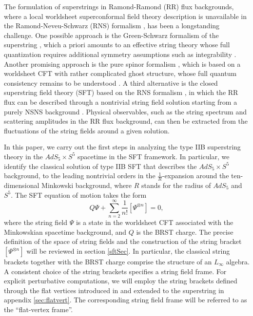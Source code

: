\documentclass[12pt]{article}
\def\be{\begin{equation}}
\def\ee{\end{equation}}
\numberwithin{equation}{section}
\begin{document}
The formulation of superstrings in Ramond-Ramond (RR) flux backgrounds, where a local worldsheet superconformal field theory description is unavailable in the Ramond-Neveu-Schwarz (RNS) formalism \cite{Friedan:1985ge, Polchinski:1998rr, Berenstein:1999ip, Berenstein:1999jq}, has been a longstanding challenge. One possible approach is the Green-Schwarz formalism of the superstring \cite{Green:1983wt, Grisaru:1985fv, Duff:1987bx, Metsaev:1998it}, which a priori amounts to an effective string theory \cite{Grisaru:1988sa, Roiban:2007jf, Giombi:2009gd} whose full quantization requires additional symmetry assumptions such as integrability \cite{Metsaev:2002re, Bena:2003wd}. Another promising approach is the pure spinor formalism \cite{Berkovits:2000fe, Berkovits:2001ue, Berkovits:2002zk, Berkovits:2004xu}, which is based on a worldsheet CFT with rather complicated ghost structure, whose full quantum consistency remains to be understood \cite{Berkovits:2006vi}. A third alternative is the closed superstring field theory (SFT) based on the RNS formalism \cite{deLacroix:2017lif, Sen:2024nfd}, in which the RR flux can be described through a nontrivial string field solution starting from a purely NSNS background \cite{Cho:2018nfn, Cho:2023mhw, Kim:2024dnw}. Physical observables, such as the string spectrum and scattering amplitudes in the RR flux background, can then be extracted from the fluctuations of the string fields around a given solution.

In this paper, we carry out the first steps in analyzing the type IIB superstring theory in the $AdS_5\times S^5$ spacetime in the SFT framework. In particular, we identify the classical solution of type IIB SFT that describes the $AdS_5 \times S^5$ background, to the leading nontrivial orders in the $\frac{1}{R}$-expansion around the ten-dimensional Minkowski background, where $R$ stands for the radius of $AdS_5$ and $S^5$. The SFT equation of motion takes the form \cite{Zwiebach:1992ie, Sen:2024nfd}
\be
Q \Psi + \sum\limits_{n=2}^\infty \frac{1}{n!}[\Psi^{\otimes n}] = 0,
\label{generalEOM}
\ee
where the string field $\Psi$ is a state in the worldsheet CFT associated with the Minkowskian spacetime background, and $Q$ is the BRST charge. The precise definition of the space of string fields and the construction of the string bracket $[\Psi^{\otimes n}]$ will be reviewed in section \ref{sftSec}. In particular, the classical string brackets together with the BRST charge comprise the structure of an $L_\infty$ algebra. A consistent choice of the string brackets specifies a string field frame. For explicit perturbative computations, we will employ the string brackets defined through the flat vertices introduced in \cite{Mazel:2024alu} and extended to the superstring in appendix \ref{sec:flatvert}. The corresponding string field frame will be referred to as the ``flat-vertex frame''.
\end{document}
